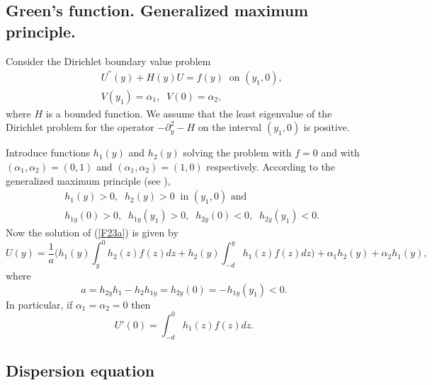 \documentclass[a4paper,reqno,12pt]{amsart}
\theoremstyle{plain}
\theoremstyle{definition}
\numberwithin{equation}{section}
\begin{document}
\subsection{Green's function. Generalized maximum principle.}\label{SM2a}

Consider the Dirichlet boundary value problem
\begin{eqnarray}\label{F23a}
&&U^{''}(y)+H(y)U=f(y)\;\;\mbox{on $(y_1,0)$},\nonumber\\
&&V(y_1)=\alpha_1,\;\;V(0)=\alpha_2,
\end{eqnarray}
where $H$ is a bounded function. We assume that the least eigenvalue of the Dirichlet problem for the operator $-\partial_y^2-H$ on the interval $(y_1,0)$ is positive.


Introduce functions $h_1(y)$ and $h_2(y)$ solving the problem with $f=0$ and with $(\alpha_1,\alpha_2)=(0,1)$ and  $(\alpha_1,\alpha_2)=(1,0)$
respectively. According to the generalized maximum principle (see \cite{PW}),
\begin{eqnarray}\label{F23aa}
&&h_1(y)>0,\;\;h_2(y)>0\;\;\mbox{in $(y_1,0)$ and}\nonumber\\
&&h_{1y}(0)>0,\;\;h_{1y}(y_1)>0,\;\;h_{2y}(0)<0,\;\;h_{2y}(y_1)<0.
\end{eqnarray}
 Now the solution of (\ref{F23a}) is given by
\begin{equation}\label{M1b}
U(y)=\frac{1}{a}\Big(h_1(y)\int_y^0h_2(z)f(z)dz+h_2(y)\int_{-d}^y h_1(z)f(z)dz\Big)
+\alpha_1h_2(y)+\alpha_2h_1(y),
\end{equation}
where
$$
a=h_{2y}h_1-h_2h_{1y}=h_{2y}(0)=-h_{1y}(y_1)<0.
$$
In particular, if $\alpha_1=\alpha_2=0$ then
\begin{equation}\label{M9a}
U'(0)=\int_{-d}^0 h_1(z)f(z)dz.
\end{equation}




\subsection{Dispersion equation}\label{SA14a}
\end{document}
